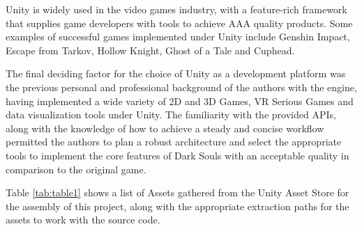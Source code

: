 \documentclass[cic,tc,english]{iiufrgs}
\begin{document}
Unity is widely used in the video games industry, with a feature-rich framework that supplies game developers with tools to achieve AAA quality products. Some examples of successful games implemented under Unity include Genshin Impact, Escape from Tarkov, Hollow Knight, Ghost of a Tale and Cuphead.

The final deciding factor for the choice of Unity as a development platform was the previous personal and professional background of the authors with the engine, having implemented a wide variety of 2D and 3D Games, VR Serious Games and data visualization tools under Unity. The familiarity with the provided APIs, along with the knowledge of how to achieve a steady and concise workflow permitted the authors to plan a robust architecture and select the appropriate tools to implement the core features of Dark Souls with an acceptable quality in comparison to the original game.




Table \ref{tab:table1} shows a list of Assets gathered from the Unity Asset Store for the assembly of this project, along with the appropriate extraction paths for the assets to work with the source code.
\end{document}
